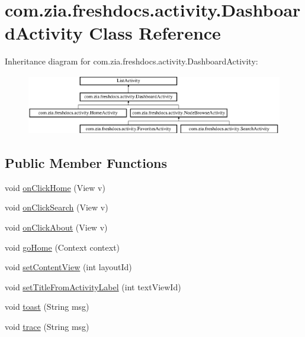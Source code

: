 \hypertarget{classcom_1_1zia_1_1freshdocs_1_1activity_1_1_dashboard_activity}{\section{com.\-zia.\-freshdocs.\-activity.\-Dashboard\-Activity Class Reference}
\label{classcom_1_1zia_1_1freshdocs_1_1activity_1_1_dashboard_activity}
}
Inheritance diagram for com.\-zia.\-freshdocs.\-activity.\-Dashboard\-Activity\-:\begin{figure}[H]
\begin{center}
\leavevmode
\includegraphics[height=2.619883cm]{classcom_1_1zia_1_1freshdocs_1_1activity_1_1_dashboard_activity}
\end{center}
\end{figure}
\subsection*{Public Member Functions}
\begin{DoxyCompactItemize}
\item 
void \hyperlink{classcom_1_1zia_1_1freshdocs_1_1activity_1_1_dashboard_activity_aab265442894d2da63fdc53ef0b7c4fb6}{on\-Click\-Home} (View v)
\item 
void \hyperlink{classcom_1_1zia_1_1freshdocs_1_1activity_1_1_dashboard_activity_ab7500caf646767f1454e76dedd7fdf52}{on\-Click\-Search} (View v)
\item 
void \hyperlink{classcom_1_1zia_1_1freshdocs_1_1activity_1_1_dashboard_activity_ac7b71dc722dcea99b28f84d481b479b9}{on\-Click\-About} (View v)
\item 
void \hyperlink{classcom_1_1zia_1_1freshdocs_1_1activity_1_1_dashboard_activity_aebb2d14c33b38487ab9ecbf0afa0e349}{go\-Home} (Context context)
\item 
void \hyperlink{classcom_1_1zia_1_1freshdocs_1_1activity_1_1_dashboard_activity_a8420e1fe1436faa264c704aa325a376b}{set\-Content\-View} (int layout\-Id)
\item 
void \hyperlink{classcom_1_1zia_1_1freshdocs_1_1activity_1_1_dashboard_activity_a1ee10ca158d1729fa2abe71cdf0b39a1}{set\-Title\-From\-Activity\-Label} (int text\-View\-Id)
\item 
void \hyperlink{classcom_1_1zia_1_1freshdocs_1_1activity_1_1_dashboard_activity_aaa6ab756007f25de3d54af09125628f4}{toast} (String msg)
\item 
void \hyperlink{classcom_1_1zia_1_1freshdocs_1_1activity_1_1_dashboard_activity_a6d8d5c067beb900debb4a4fa8f105808}{trace} (String msg)
\end{DoxyCompactItemize}
